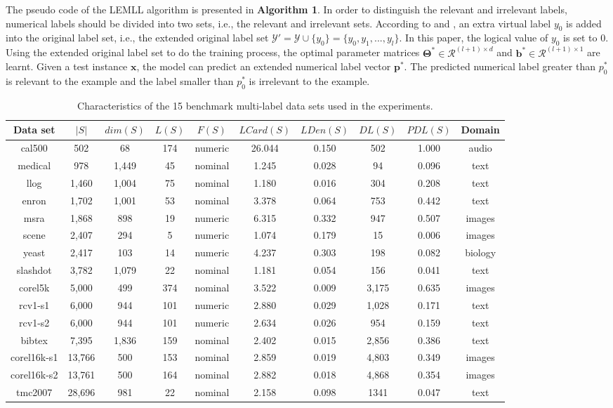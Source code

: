 \documentclass[conference]{IEEEtran}
\begin{document}
The pseudo code of the LEMLL algorithm is presented in \textbf{Algorithm 1}. In order to distinguish the relevant and irrelevant labels, numerical labels should be divided into two sets, i.e., the relevant and irrelevant sets. According to \cite{furnkranz2008multilabel} and \cite{li2015leveraging}, an extra virtual label $y_0$ is added into the original label set, i.e., the extended original label set $\mathcal{Y}' = \mathcal{Y} \cup \{y_0\} = \{y_0,y_1,...,y_l\}$. In this paper, the logical value of $y_0$ is set to 0. Using the extended original label set to do the training process, the optimal parameter matrices $\bm{\Theta}^{*} \in \mathcal{R}^{(l+1) \times d}$ and $\bm{b}^{*} \in \mathcal{R}^{(l+1)\times 1}$ are learnt. Given a test instance $\bm{x}$, the model can predict an extended numerical label vector $\bm{p}^*$. The predicted numerical label greater than $p_0^{*}$ is relevant to the example and the label smaller than $p_0^{*}$ is irrelevant to the example.

\begin{table*}[!htb]
\caption{Characteristics of the 15 benchmark multi-label data sets used in the experiments.}
\fontsize{7}{7}\selectfont
\center
\begin{tabular}{c c c c c c c c c c}
\midrule\midrule
Data set & $|S|$ & $dim(S)$ & $L(S)$ & $F(S)$ & $LCard(S)$ & $LDen(S)$ & $DL(S)$ & $PDL(S)$ & Domain \\
\midrule
cal500 &502 &68 &174 &numeric &26.044 &0.150 &502 &1.000 &audio\\
medical &978 &1,449 &45 &nominal &1.245 &0.028 &94 &0.096 &text\\
llog &1,460 &1,004 &75 &nominal &1.180 &0.016 &304 &0.208 &text\\
enron &1,702 &1,001 &53 &nominal &3.378 &0.064 &753 &0.442 &text\\
msra &1,868 &898 &19 &numeric &6.315 &0.332 &947 &0.507 &images \\
scene &2,407 &294 &5 &numeric &1.074 &0.179 &15 &0.006 &images\\
yeast &2,417 &103 &14 &numeric &4.237 &0.303 &198 &0.082 &biology \\
slashdot &3,782 &1,079 &22 &nominal &1.181 &0.054 &156 &0.041 &text \\
corel5k &5,000 &499 &374 &nominal &3.522 &0.009 &3,175 &0.635 &images \\
rcv1-s1 &6,000 &944 &101 &numeric &2.880 &0.029 &1,028 &0.171 &text \\
rcv1-s2 &6,000 &944 &101 &numeric &2.634 &0.026 &954 &0.159 &text \\
bibtex &7,395 &1,836 &159 &nominal &2.402 &0.015 &2,856 &0.386 &text\\
corel16k-s1 &13,766 &500 &153 &nominal &2.859 &0.019 &4,803 &0.349 &images \\
corel16k-s2 &13,761 &500 &164 &nominal &2.882 &0.018 &4,868 &0.354 &images \\
tmc2007 &28,696 &981 &22 &nominal &2.158 &0.098 &1341 &0.047 &text\\
\midrule\midrule
\end{tabular}
\end{table*}
\end{document}
